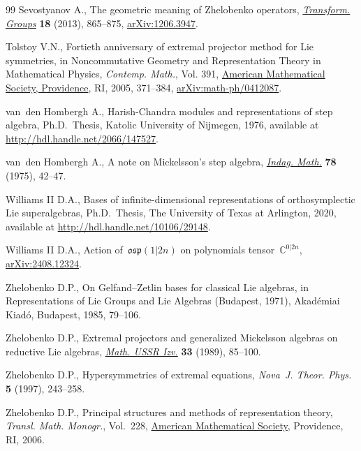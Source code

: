 \begin{thebibliography}{99}
Sevostyanov A., The geometric meaning of {Z}helobenko operators,
 \href{https://doi.org/10.1007/s00031-013-9234-9}{\textit{Transform. Groups}} \textbf{18} (2013), 865--875, \href{https://arxiv.org/abs/1206.3947}{arXiv:1206.3947}.

Tolstoy V.N., Fortieth anniversary of extremal projector method for {L}ie
 symmetries, in Noncommutative {G}eometry and {R}epresentation {T}heory in
 {M}athematical {P}hysics, \textit{Contemp. Math.}, Vol. 391, \href{https://doi.org/10.1090/conm/391/07342}{American
 Mathematical Society, Providence}, RI, 2005, 371--384,
 \href{https://arxiv.org/abs/math-ph/0412087}{arXiv:math-ph/0412087}.

van~den Hombergh A., Harish-Chandra modules and representations of step
 algebra, Ph.D.~Thesis, {K}atolic University of {N}ijmegen, 1976, available at
 \url{http://hdl.handle.net/2066/147527}.

van~den Hombergh A., A note on {M}ickelsson's step algebra, \href{https://doi.org/10.1016/1385-7258(75)90013-X}{\textit{Indag.
 Math.}} \textbf{78} (1975), 42--47.

Williams II D.A., Bases of infinite-dimensional representations of
 orthosymplectic {L}ie superalgebras, Ph.D.~Thesis, {T}he University of
 {T}exas at {A}rlington, 2020, available at
 \url{http://hdl.handle.net/10106/29148}.

Williams II D.A., Action of~$\mathfrak{osp}(1|2n)$ on polynomials
 tensor~$\mathbb{C}^{0|2n}$, \href{https://arxiv.org/abs/2408.12324}{arXiv:2408.12324}.

Zhelobenko D.P., On {G}elfand--{Z}etlin bases for classical {L}ie algebras, in
 Representations of {L}ie {G}roups and {L}ie {A}lgebras ({B}udapest, 1971),
 Akad\'emiai Kiad\'o, Budapest, 1985, 79--106.

Zhelobenko D.P., Extremal projectors and generalized {M}ickelsson algebras on
 reductive {L}ie algebras, \href{https://doi.org/10.1070/IM1989v033n01ABEH000815}{\textit{Math. USSR Izv.}} \textbf{33} (1989),
 85--100.

Zhelobenko D.P., Hypersymmetries of extremal equations, \textit{Nova~J. Theor.
 Phys.} \textbf{5} (1997), 243--258.

Zhelobenko D.P., Principal structures and methods of representation theory,
 \textit{Transl. Math. Monogr.}, Vol.~228, \href{https://doi.org/10.1090/mmono/228}{American Mathematical Society},
 Providence, RI, 2006.

\end{thebibliography}
